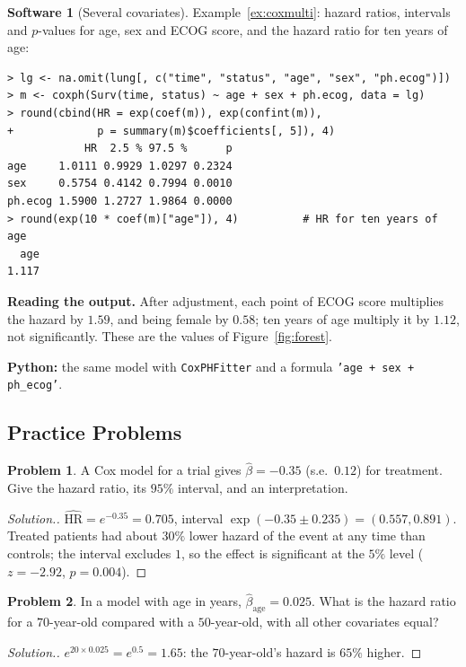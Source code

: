 \documentclass[11pt,a4paper]{article}
\numberwithin{equation}{section}
\theoremstyle{definition}
\newtheorem{software}[thm]{Software}
\newtheorem{problemx}{Problem}[subsection]
\newenvironment{problem}{\begin{problemx}}{\end{problemx}}
\newenvironment{solution}
  {\renewcommand{\qedsymbol}{}\begin{proof}[\textit{Solution}.]}
  {\end{proof}}
\begin{document}
\begin{software}[Several covariates]
\label{sw:coxmulti}
Example~\ref{ex:coxmulti}: hazard ratios, intervals and $p$-values for age, sex and ECOG score, and the hazard ratio for ten years of age:
{\small\begin{verbatim}
> lg <- na.omit(lung[, c("time", "status", "age", "sex", "ph.ecog")])
> m <- coxph(Surv(time, status) ~ age + sex + ph.ecog, data = lg)
> round(cbind(HR = exp(coef(m)), exp(confint(m)),
+             p = summary(m)$coefficients[, 5]), 4)
            HR  2.5 % 97.5 %      p
age     1.0111 0.9929 1.0297 0.2324
sex     0.5754 0.4142 0.7994 0.0010
ph.ecog 1.5900 1.2727 1.9864 0.0000
> round(exp(10 * coef(m)["age"]), 4)          # HR for ten years of age
  age 
1.117 
\end{verbatim}}
\textbf{Reading the output.} After adjustment, each point of ECOG score multiplies the hazard by $1.59$, and being female by $0.58$; ten years of age multiply it by $1.12$, not significantly. These are the values of Figure~\ref{fig:forest}.

\textbf{Python:} the same model with \texttt{CoxPHFitter} and a formula \texttt{'age + sex + ph\_ecog'}.
\end{software}

\subsection{Practice Problems}

\begin{problem}
A Cox model for a trial gives $\hat\beta = -0.35$ (s.e.\ $0.12$) for treatment. Give the hazard ratio, its $95\%$ interval, and an interpretation.
\end{problem}

\begin{solution}
$\widehat{\text{HR}} = e^{-0.35} = 0.705$, interval $\exp(-0.35 \pm 0.235) = (0.557, 0.891)$. Treated patients had about $30\%$ lower hazard of the event at any time than controls; the interval excludes $1$, so the effect is significant at the $5\%$ level ($z = -2.92$, $p = 0.004$).
\end{solution}

\begin{problem}
In a model with age in years, $\hat\beta_{\text{age}} = 0.025$. What is the hazard ratio for a $70$-year-old compared with a $50$-year-old, with all other covariates equal?
\end{problem}

\begin{solution}
$e^{20 \times 0.025} = e^{0.5} = 1.65$: the $70$-year-old's hazard is $65\%$ higher.
\end{solution}
\end{document}
